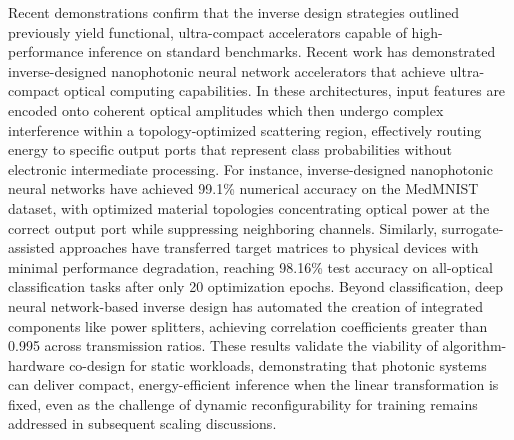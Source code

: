 Recent demonstrations confirm that the inverse design strategies outlined previously yield functional, ultra-compact accelerators capable of high-performance inference on standard benchmarks. Recent work has demonstrated inverse-designed nanophotonic neural network accelerators that achieve ultra-compact optical computing capabilities. \citep{doi_10_1038_s41467_026_68648_1_26658a9c} In these architectures, input features are encoded onto coherent optical amplitudes which then undergo complex interference within a topology-optimized scattering region, effectively routing energy to specific output ports that represent class probabilities without electronic intermediate processing. For instance, inverse-designed nanophotonic neural networks have achieved 99.1\% numerical accuracy on the MedMNIST dataset, with optimized material topologies concentrating optical power at the correct output port while suppressing neighboring channels. Similarly, surrogate-assisted approaches have transferred target matrices to physical devices with minimal performance degradation, reaching 98.16\% test accuracy on all-optical classification tasks after only 20 optimization epochs. Beyond classification, deep neural network-based inverse design has automated the creation of integrated components like power splitters, achieving correlation coefficients greater than 0.995 across transmission ratios. These results validate the viability of algorithm-hardware co-design for static workloads, demonstrating that photonic systems can deliver compact, energy-efficient inference when the linear transformation is fixed, even as the challenge of dynamic reconfigurability for training remains addressed in subsequent scaling discussions. \citep{doi_10_1038_s41467_026_68648_1_26658a9c} \citep{s2_753a5d83a96e0194da93bcb6f20fa0bd356e37fa_c11e3796} \citep{s2_0482241c1bd933adb55a6674133d1688626bdab1_17e7627d}

